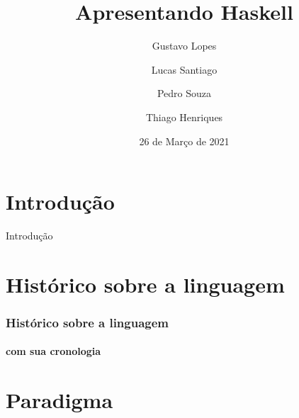 \documentclass[aspectratio=169]{beamer}
\title{Apresentando Haskell}
\author{Gustavo Lopes \and Lucas Santiago \and Pedro Souza \and Thiago Henriques }
\institute{Pontifícia Universidade Católica de Minas Gerais}
\date{26 de Março de 2021}
\begin{document}



    \section{Introdução}

    \begin{frame}{Introdução}

    

    \end{frame}

    \section{Histórico sobre a linguagem}
    \begin{frame}

      \frametitle{Histórico sobre a linguagem}
      \framesubtitle{com sua cronologia}

    \end{frame}

    \section{Paradigma}
\end{document}
